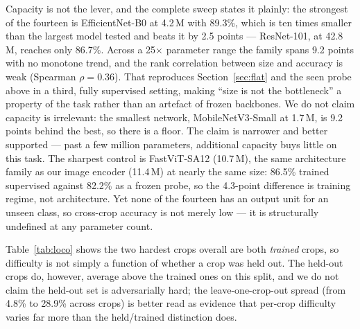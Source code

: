 \documentclass[a4paper,fleqn]{cas-dc}
\begin{document}
Capacity is not the lever, and the complete sweep states it plainly: the strongest of the fourteen is
EfficientNet-B0 at 4.2\,M with 89.3\%, which is ten times smaller than the largest model tested and
beats it by 2.5 points --- ResNet-101, at 42.8\,M, reaches only 86.7\%. Across a 25$\times$ parameter
range the family spans 9.2 points with no monotone trend, and the rank correlation between size and
accuracy is weak (Spearman $\rho = 0.36$). That reproduces Section~\ref{sec:flat} and the seen probe
above in a third, fully supervised setting, making ``size is not the bottleneck'' a property of the
task rather than an artefact of frozen backbones. We do not claim capacity is irrelevant: the
smallest network, MobileNetV3-Small at 1.7\,M, is 9.2 points behind the best, so there is a floor.
The claim is narrower and better supported --- past a few million parameters, additional capacity
buys little on this task. The sharpest control is FastViT-SA12 (10.7\,M), the same architecture
family as our image encoder (11.4\,M) at nearly the same size: 86.5\% trained supervised against
82.2\% as a frozen probe, so the 4.3-point difference is training regime, not architecture. Yet none
of the fourteen has an output unit for an unseen class, so cross-crop accuracy is not merely low ---
it is structurally undefined at any parameter count.

Table~\ref{tab:loco} shows the two hardest crops overall are both \emph{trained} crops, so
difficulty is not simply a function of whether a crop was held out. The held-out crops do,
however, average above the trained ones on this split, and we do not claim the held-out set is
adversarially hard; the leave-one-crop-out spread (from 4.8\% to 28.9\% across crops) is better
read as evidence that per-crop difficulty varies far more than the held/trained distinction does.
\end{document}
